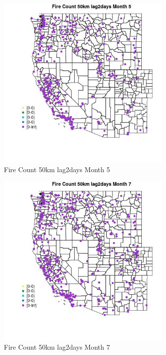 \begin{figure} 
\centering  
\includegraphics[width=0.77\textwidth]{Code_Outputs/Report_ML_input_PM25_Step4_part_e_de_duplicated_aves_compiled_2019-05-18wNAs_MapObsMo5Fire_Count_50km_lag2days.jpg} 
\caption{\label{fig:Report_ML_input_PM25_Step4_part_e_de_duplicated_aves_compiled_2019-05-18wNAsMapObsMo5Fire_Count_50km_lag2days}Fire Count 50km lag2days Month 5} 
\end{figure} 
 

\begin{figure} 
\centering  
\includegraphics[width=0.77\textwidth]{Code_Outputs/Report_ML_input_PM25_Step4_part_e_de_duplicated_aves_compiled_2019-05-18wNAs_MapObsMo7Fire_Count_50km_lag2days.jpg} 
\caption{\label{fig:Report_ML_input_PM25_Step4_part_e_de_duplicated_aves_compiled_2019-05-18wNAsMapObsMo7Fire_Count_50km_lag2days}Fire Count 50km lag2days Month 7} 
\end{figure} 
 

